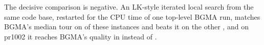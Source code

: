 The decisive comparison is negative. An LK-style iterated local search from the same code base,
restarted for the CPU time of one top-level BGMA run, matches BGMA's median tour on  of
these  instances and beats it on the other , and on pr1002 it reaches BGMA's
quality in  instead of .

